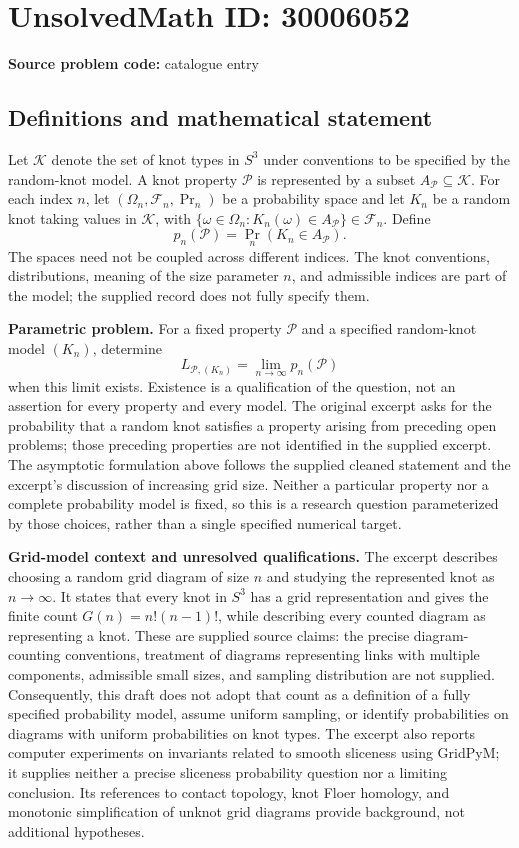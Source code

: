 \documentclass[11pt]{article}
\begin{document}
\section*{UnsolvedMath ID: 30006052}
\textbf{Source problem code:} catalogue entry
\subsection{Definitions and mathematical statement}
Let \(\mathscr K\) denote the set of knot types in \(S^3\) under conventions to be specified by the random-knot model. A knot property \(\mathcal P\) is represented by a subset \(A_{\mathcal P}\subseteq\mathscr K\). For each index \(n\), let \((\Omega_n,\mathcal F_n,\Pr_n)\) be a probability space and let \(K_n\) be a random knot taking values in \(\mathscr K\), with \(\{\omega\in\Omega_n:K_n(\omega)\in A_{\mathcal P}\}\in\mathcal F_n\). Define
\[
p_n(\mathcal P)=\Pr_n\!\left(K_n\in A_{\mathcal P}\right).
\]
The spaces need not be coupled across different indices. The knot conventions, distributions, meaning of the size parameter \(n\), and admissible indices are part of the model; the supplied record does not fully specify them.

\textbf{Parametric problem.} For a fixed property \(\mathcal P\) and a specified random-knot model \((K_n)\), determine
\[
L_{\mathcal P,(K_n)}=\lim_{n\to\infty}p_n(\mathcal P)
\]
when this limit exists. Existence is a qualification of the question, not an assertion for every property and every model. The original excerpt asks for the probability that a random knot satisfies a property arising from preceding open problems; those preceding properties are not identified in the supplied excerpt. The asymptotic formulation above follows the supplied cleaned statement and the excerpt's discussion of increasing grid size. Neither a particular property nor a complete probability model is fixed, so this is a research question parameterized by those choices, rather than a single specified numerical target.

\textbf{Grid-model context and unresolved qualifications.} The excerpt describes choosing a random grid diagram of size \(n\) and studying the represented knot as \(n\to\infty\). It states that every knot in \(S^3\) has a grid representation and gives the finite count \(G(n)=n!(n-1)!\), while describing every counted diagram as representing a knot. These are supplied source claims: the precise diagram-counting conventions, treatment of diagrams representing links with multiple components, admissible small sizes, and sampling distribution are not supplied. Consequently, this draft does not adopt that count as a definition of a fully specified probability model, assume uniform sampling, or identify probabilities on diagrams with uniform probabilities on knot types. The excerpt also reports computer experiments on invariants related to smooth sliceness using GridPyM; it supplies neither a precise sliceness probability question nor a limiting conclusion. Its references to contact topology, knot Floer homology, and monotonic simplification of unknot grid diagrams provide background, not additional hypotheses.
\end{document}
